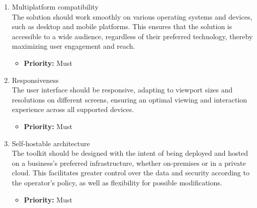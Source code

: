 \begin{enumerate}[label=\textbf{NF\arabic*:}, leftmargin=*]

\item \label{itm:NF1} Multiplatform compatibility
\vspace{2pt}
\\The solution should work smoothly on various operating systems and devices, such as desktop and mobile platforms. This ensures that the solution is accessible to a wide audience, regardless of their preferred technology, thereby maximizing user engagement and reach.
\begin{itemize}[noitemsep, label=\trianglebullet]
    \item \textbf{Priority:} Must
\end{itemize}
\vspace{4pt}

\item \label{itm:NF2} Responsiveness
\vspace{2pt}
\\The user interface should be responsive, adapting to viewport sizes and resolutions on different screens, ensuring an optimal viewing and interaction experience across all supported devices.
\begin{itemize}[noitemsep, label=\trianglebullet]
    \item \textbf{Priority:} Must
\end{itemize}
\vspace{4pt}

\item \label{itm:NF3} Self-hostable architecture
\vspace{2pt}
\\The toolkit should be designed with the intent of being deployed and hosted on a business's preferred infrastructure, whether on-premises or in a private cloud. This facilitates greater control over the data and security according to the operator's policy, as well as flexibility for possible modifications.
\begin{itemize}[noitemsep, label=\trianglebullet]
    \item \textbf{Priority:} Must
\end{itemize}
\vspace{4pt}


\end{enumerate}
